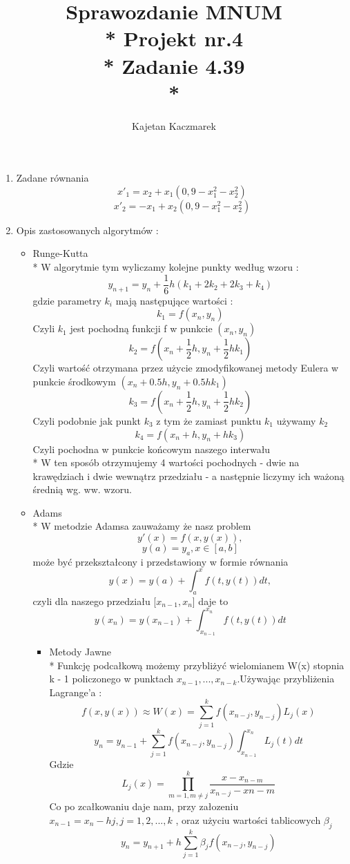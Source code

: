 \documentclass[a4paper, 11pt]{article}
\author{Kajetan Kaczmarek}
\begin{document}
\title{Sprawozdanie MNUM \\* Projekt nr.4 \\* 
Zadanie 4.39 \\*}
\maketitle

\begin{enumerate}
\item \*
Zadane równania \[ x'_1 = x_2 + x_1(0,9 - x_1^2 - x_2^2) \] 
\[ x'_2 = -x_1 + x_2(0,9 - x_1^2 - x_2^2) \]
\item Opis zastosowanych algorytmów : 
\begin{itemize}
\item Runge-Kutta \\*
W algorytmie tym wyliczamy kolejne punkty według wzoru :
\[ y_{n+1} = y_n + \dfrac{1}{6}h(k_1 + 2k_2 + 2k_3 + k_4 )\] 
gdzie parametry \( k_i \) mają następujące wartości : 
\[k_1 = f(x_n, y_n)\]
Czyli \(k_1 \) jest pochodną funkcji f w punkcie \((x_n, y_n)\)
\[k_2 = f(x_n + \dfrac{1}{2}h , y_n +\dfrac{1}{2}hk_1 )\]
Czyli wartość otrzymana przez użycie zmodyfikowanej metody Eulera w punkcie środkowym \( (x_n + 0.5h,y_n + 0.5hk_1)\)
\[k_3 = f(x_n+\dfrac{1}{2}h , y_n + \dfrac{1}{2}hk_2 )\]
Czyli podobnie jak punkt \(k_3\) z tym że zamiast punktu \(k_1\) używamy \(k_2\)  
\[k_4 = f(x_n+h , y_n + hk_3)\]
Czyli pochodna w punkcie końcowym naszego interwału \\*
W ten sposób otrzymujemy 4 wartości pochodnych - dwie na krawędziach i dwie wewnątrz przedziału - a następnie liczymy ich ważoną średnią wg. ww. wzoru.
\item Adams \\*
W metodzie Adamsa zauważamy że nasz problem \[ y'(x) = f(x,y(x)), \] \[ y(a) = y_a , x\in [a,b] \] może być przekształcony i przedstawiony w formie równania \[ y(x) = y(a) + \int_{a}^{x} f(t,y(t)) dt,\] czyli dla naszego przedziału [$x_{n-1} , x_n $] daje to  \[ y(x_n) = y(x_{n-1}) + \int_{x_{n-1}}^{x_n} f(t,y(t)) dt\] 
\begin{itemize}
\item Metody Jawne \\*
Funkcję podcałkową możemy przybliżyć wielomianem W(x) stopnia  k - 1 policzonego w punktach \( x_{n-1} , ... , x_{n-k}\).Używając przybliżenia Lagrange'a : \[ f(x,y(x)) \approx W(x) = \sum\limits_{j = 1}^k f(x_{n-j},y_{n-j})L_j(x)  \]
 \[ y_n = y_{n-1} +  \sum\limits_{j = 1}^k f(x_{n-j},y_{n-j}) \int_{x_{n-1}}^{x_n}L_j(t)  dt\]
 Gdzie
 \[ L_j(x) = \prod\limits_{m=1,m\neq j}^k \dfrac{x - x_{n-m}}{x_{n-j} - x{n-m}} \]
 Co po zcałkowaniu daje nam, przy załozeniu \( x_{n-1} = x_n - hj , j= 1,2,...,k \) , oraz użyciu wartości tablicowych \( \beta_j \)
 \[ y_n = y_{n+1} + h\sum\limits_{j = 1}^k \beta_j f(x_{n-j},y_{n-j})\]
 

\end{itemize}
\end{itemize}
\end{enumerate}
\end{document}
